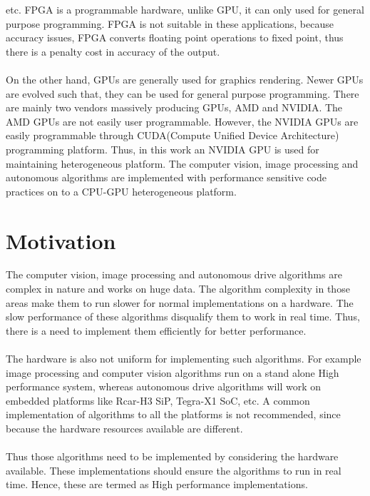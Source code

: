 etc. FPGA is a programmable hardware, unlike GPU, it can only used for general purpose programming. FPGA is not suitable in these applications, because accuracy issues, FPGA converts floating point operations to fixed point, thus there is a penalty cost in accuracy of the output. \paragraph*{}On the other hand, GPUs are generally used for graphics rendering. Newer GPUs are evolved such that, they can be used for general purpose programming. There are mainly two vendors massively producing GPUs, AMD and NVIDIA. The AMD GPUs are not easily user programmable. However, the NVIDIA GPUs are easily programmable through CUDA(Compute Unified Device Architecture) programming platform. Thus, in this work an NVIDIA GPU is used for maintaining heterogeneous platform. The computer vision, image processing and autonomous algorithms are implemented with performance sensitive code practices on to a CPU-GPU heterogeneous platform.

\section{Motivation}
The computer vision, image processing and autonomous drive algorithms are complex in nature and works on huge data. The algorithm complexity in those areas make them to run slower for normal implementations on a hardware. The slow performance of these algorithms disqualify them to work in real time. Thus, there is a need to implement them efficiently for better performance. \paragraph*{}The hardware is also not uniform for implementing such algorithms. For example image processing and computer vision algorithms run on a stand alone High performance system, whereas autonomous drive algorithms will work on embedded platforms like Rcar-H3 SiP, Tegra-X1 SoC, etc. A common implementation of algorithms to all the platforms is not recommended, since because the hardware resources available are different.\paragraph*{}Thus those algorithms need to be implemented by considering the hardware available. These implementations should ensure the algorithms to run in real time. Hence, these are termed as High performance implementations.

